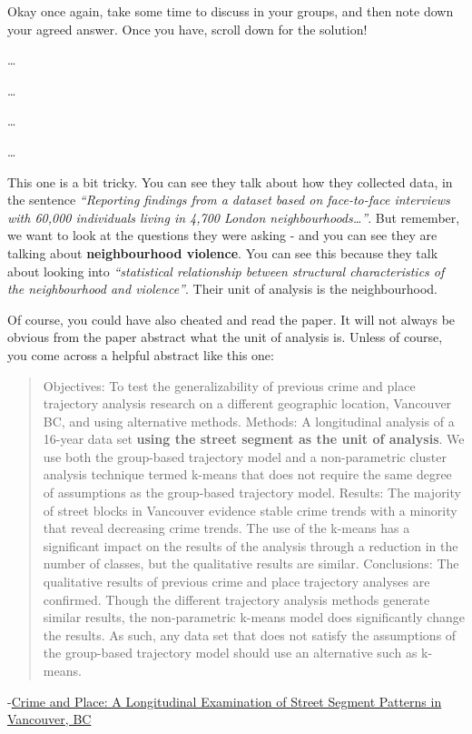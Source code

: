 \documentclass[
]{book}
\begin{document}
Okay once again, take some time to discuss in your groups, and then note down your agreed answer. Once you have, scroll down for the solution!

\ldots{}

\ldots{}

\ldots{}

\ldots{}

This one is a bit tricky. You can see they talk about how they collected data, in the sentence \emph{``Reporting findings from a dataset based on face-to-face interviews with 60,000 individuals living in 4,700 London neighbourhoods\ldots{}''}. But remember, we want to look at the questions they were asking - and you can see they are talking about \textbf{neighbourhood violence}. You can see this because they talk about looking into \emph{``statistical relationship between structural characteristics of the neighbourhood and violence''}. Their unit of analysis is the neighbourhood.

Of course, you could have also cheated and read the paper. It will not always be obvious from the paper abstract what the unit of analysis is. Unless of course, you come across a helpful abstract like this one:

\begin{quote}
Objectives: To test the generalizability of previous crime and place trajectory analysis research on a different geographic location, Vancouver BC, and using alternative methods.
Methods: A longitudinal analysis of a 16-year data set \textbf{using the street segment as the unit of analysis}. We use both the group-based trajectory model and a non-parametric cluster analysis technique termed k-means that does not require the same degree of assumptions as the group-based trajectory model.
Results: The majority of street blocks in Vancouver evidence stable crime trends with a minority that reveal decreasing crime trends. The use of the k-means has a significant impact on the results of the analysis through a reduction in the number of classes, but the qualitative results are similar.
Conclusions: The qualitative results of previous crime and place trajectory analyses are confirmed. Though the different trajectory analysis methods generate similar results, the non-parametric k-means model does significantly change the results. As such, any data set that does not satisfy the assumptions of the group-based trajectory model should use an alternative such as k-means.
\end{quote}

-\href{https://link.springer.com/article/10.1007/s10940-014-9228-3}{Crime and Place: A Longitudinal Examination of Street Segment Patterns in Vancouver, BC}
\end{document}
